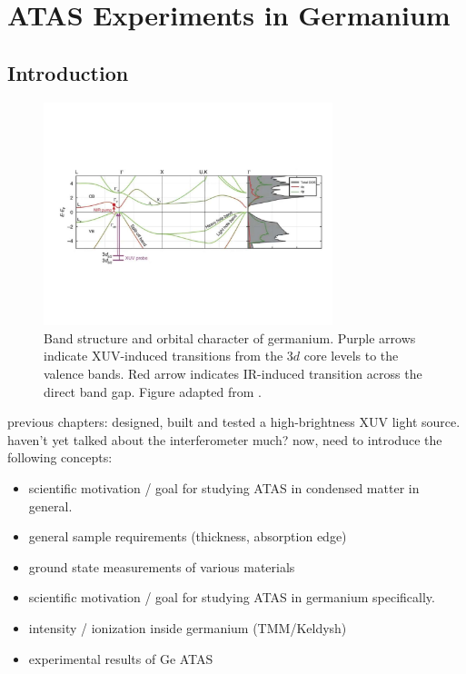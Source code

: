 \chapter{ATAS Experiments in Germanium}
\label{chap:ATAS_in_Ge}


\section{Introduction}







\begin{figure}
	\centering
	\includegraphics[width=0.75\textwidth]{figures/chap4/Ge_band_diagram_Zurch2017.pdf}
	\caption{Band structure and orbital character of germanium. Purple arrows indicate XUV-induced transitions from the $3d$ core levels to the valence bands. Red arrow indicates IR-induced transition across the direct band gap. Figure adapted from \cite{zurchDirectSimultaneousObservation2017}.}
	\label{fig:Ge_band_diagram}
\end{figure}

previous chapters: designed, built and tested a high-brightness XUV light source. haven't yet talked about the interferometer much? now, need to introduce the following concepts:
\begin{itemize}
	\item scientific motivation / goal for studying ATAS in condensed matter in general.
	\item general sample requirements (thickness, absorption edge)
	\item ground state measurements of various materials
	\item scientific motivation / goal for studying ATAS in germanium specifically.
	\item intensity / ionization inside germanium (TMM/Keldysh)
	\item experimental results of Ge ATAS

\end{itemize}

